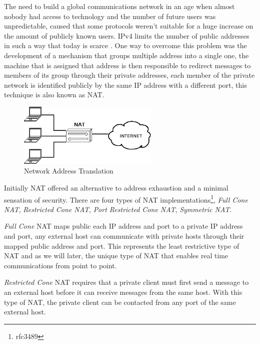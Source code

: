 The need to build a global communications network in an age when almost nobody had access to technology and the number of future users was unpredictable, caused that some protocols weren't suitable for a huge increase on the amount of publicly known users. \ac{IPv4} limits the number of public addresses in such a way that today is scarce \cite{ipv4}. One way to overcome this problem was the development of a mechanism that groups multiple address into a single one, the machine that is assigned that address is then responsible to redirect messages to members of its group through their private addresses, each member of the private network is identified publicly by the same \ac{IP} address with a different port, this technique is also known as \ac{NAT}.

\begin{figure}[H]
	\begin{center}
		\centering
		\includegraphics[width=0.6\textwidth]{figures/nat.png}

	\caption{Network Address Translation}
	\end{center}
\end{figure}

Initially \ac{NAT} offered an alternative to address exhaustion and a minimal sensation of security. There are four types of \ac{NAT} implementations\footnote{rfc3489}, \textit{Full Cone NAT}, \textit{Restricted Cone NAT}, \textit{Port Restricted Cone NAT}, \textit{Symmetric NAT}.

\textit{Full Cone} \ac{NAT} maps public each \ac{IP} address and port to a private \ac{IP} address and port, any external host can communicate with private hosts through their mapped public address and port. This represents the least restrictive type of \ac{NAT} and as we will later, the unique type of \ac{NAT} that enables real time communications from point to point.

\textit{Restricted Cone} \ac{NAT} requires that a private client must first send a message to an external host before it can receive messages from the same host. With this type of \ac{NAT}, the private client can be contacted from any port of the same external host.

